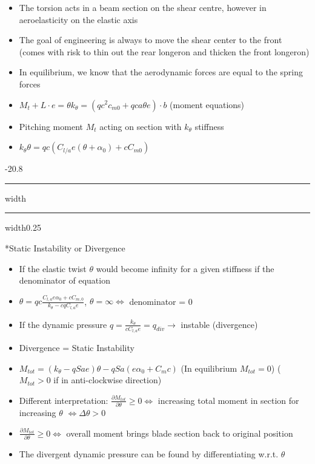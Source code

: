 \documentclass[8pt, landscape, fleqn]{scrartcl}
\makeatletter
\renewcommand{\subsection}{\@startsection{subsection}{1}{0mm}%
{-2\baselineskip}{0.8\baselineskip}%
{\hrule depth 0.2pt width\columnwidth\hrule depth0.75pt
width0.25\columnwidth\vspace*{1.2em}\large\bfseries\rmfamily}}
\makeatother
\begin{document}
\begin{multicols*}{3}
\begin{itemize}
    \item The torsion acts in a beam section on the shear centre, however in aeroelasticity on the elastic axis
    \item The goal of engineering is always to move the shear center to the front (comes with risk to thin out
    the rear longeron and thicken the front longeron)
    \item In equilibrium, we know that the aerodynamic forces are equal to the spring forces
    \item $M_t + L \cdot e = \theta k_\theta = (q c^2 c_{m0}+ qca\theta e)\cdot b$ (moment equations)
    \item Pitching moment $M_t$ acting on section with $k_\theta$ stiffness
    \item $k_\theta \theta = qc (C_{l/a} e (\theta + \alpha_0)+c C_{m0})$ 
\end{itemize}

\subsection*{Static Instability or Divergence}

\begin{itemize}
    \item If the elastic twist $\theta$ would become infinity for a given stiffness if the denominator of equation
    \item $\theta = qc \frac{C_{l,a} e \alpha_0 + c C_{m,0}}{k_\theta - cqC_{l,a}e}$, $\theta = \infty \Leftrightarrow$ denominator = 0
    \item If the dynamic pressure $q = \frac{k_\theta}{c C_{l,a}e} = q_{div} \rightarrow$ instable (divergence)
    \item Divergence = Static Instability
    \item $M_{tot} = (k_{\theta} -q Sae) \theta - qSa (e\alpha_0 + C_mc)$ (In equilibrium $M_{tot} = 0$) ($M_{tot} > 0$ if in anti-clockwise direction)
    \item Different interpretation: $\frac{\partial M_{tot}}{\partial \theta} \geq 0 \Leftrightarrow $ increasing total moment in section for increasing $\theta$ $ \Leftrightarrow \Delta \theta > 0$
    \item $\frac{\partial M_{tot}}{\partial \theta} \geq 0 \Leftrightarrow$ overall moment brings blade section back to original position
    \item The divergent dynamic pressure can be found by differentiating w.r.t. $\theta$ 
\end{itemize}


\end{multicols*}
\end{document}
